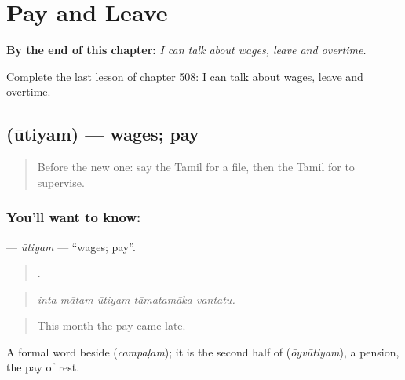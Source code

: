 
\chapter{Pay and Leave}
\label{ch:ta-pay-and-leave}

\begin{chapteropening}
\textbf{By the end of this chapter:} \emph{I can talk about wages, leave and overtime.}

Complete the last lesson of chapter 508: I can talk about wages, leave and overtime.
\end{chapteropening}

\section[\texorpdfstring{\ta{ஊதியம்} (ūtiyam)}{ஊதியம் (ūtiyam)}]{ (ūtiyam) — wages; pay}

\label{lesson:TA-C508-utiyam}



\begin{quote}
Before the new one: say the Tamil for a file, then the Tamil for to supervise.
\end{quote}

\subsection*{You'll want to know: }
\textbf{} — \emph{ūtiyam} — \textquotedblleft{}wages; pay\textquotedblright{}.

\begin{quote}
    .
\end{quote}

\begin{quote}
\emph{inta mātam ūtiyam tāmatamāka vantatu.}
\end{quote}

\begin{quote}
This month the pay came late.
\end{quote}

A formal word beside  (\emph{campaḷam}); it is the second half of  (\emph{ōyvūtiyam}), a pension, the pay of rest.

